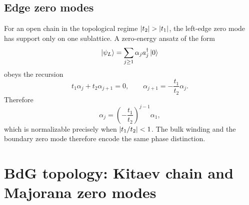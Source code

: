 \subsection{Edge zero modes}
\label{subsec:topo-ssh-edge-zero-modes}

For an open chain in the topological regime $\abs{t_2}>\abs{t_1}$, the left-edge
zero mode has support only on one sublattice.  A zero-energy ansatz of the form
\begin{equation}
\label{eq:topo-ssh-left-edge-ansatz}
    \left|\psi_L\right\rangle=\sum_{j\geq 1}\alpha_j a_j^\dagger\left|0\right\rangle
\end{equation}
obeys the recursion
\begin{equation}
\label{eq:topo-ssh-edge-recursion}
    t_1\alpha_j+t_2\alpha_{j+1}=0,
    \qquad
    \alpha_{j+1}=-\frac{t_1}{t_2}\alpha_j .
\end{equation}
Therefore
\begin{equation}
\label{eq:topo-ssh-edge-wavefunction}
    \alpha_j=\left(-\frac{t_1}{t_2}\right)^{j-1}\alpha_1,
\end{equation}
which is normalizable precisely when $\left|t_1/t_2\right|<1$.  The bulk winding and
the boundary zero mode therefore encode the same phase distinction.

\section{BdG topology: Kitaev chain and Majorana zero modes}
\label{sec:topo-bdg-kitaev}

